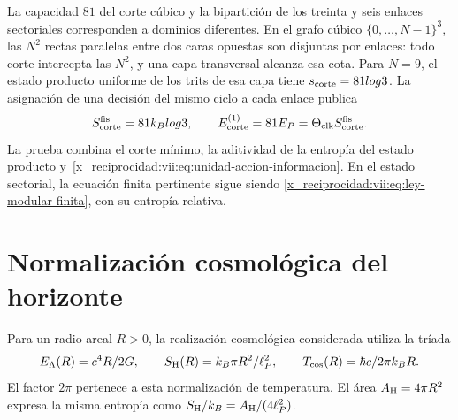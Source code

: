 La capacidad \(81\) del corte cúbico y la bipartición de los treinta y
seis enlaces sectoriales corresponden a dominios diferentes. En el
grafo cúbico \(\{0,\ldots,N-1\}^3\), las \(N^2\) rectas
paralelas entre dos caras opuestas son disjuntas por enlaces: todo corte
intercepta las \(N^2\), y una capa transversal alcanza esa cota.
Para \(N=9\), el estado producto uniforme de los trits de esa capa
tiene \(s_{\rm corte}=81\log3\). La asignación de una decisión del
mismo ciclo a cada enlace publica
\begin{equation}
 S_{\rm corte}^{\rm fis}=81k_B\log3,\qquad
 E_{\rm corte}^{(1)}=81E_P
                  =\Theta_{\rm clk}S_{\rm corte}^{\rm fis}.
 \label{x_reciprocidad:vii:eq:corte-energia-informacion}
\end{equation}
La prueba combina el corte mínimo, la aditividad de la entropía del
estado producto y~\eqref{x_reciprocidad:vii:eq:unidad-accion-informacion}. En el estado
sectorial, la ecuación finita pertinente sigue siendo
\eqref{x_reciprocidad:vii:eq:ley-modular-finita}, con su entropía relativa.

\section{Normalización cosmológica del horizonte}
\label{x_reciprocidad:vii:subsec:balance-horizonte}

Para un radio areal \(R>0\), la realización cosmológica considerada
utiliza la tríada
\begin{equation}
 E_\Lambda(R)=\frac{c^4R}{2G},\qquad
 S_{\rm H}(R)=\frac{k_B\pi R^2}{\ell_P^2},\qquad
 T_{\rm cos}(R)=\frac{\hbar c}{2\pi k_BR}.
 \label{x_reciprocidad:vii:eq:horizonte-cosmologico}
\end{equation}
El factor \(2\pi\) pertenece a esta normalización de temperatura.
El área \(\mathcal A_{\rm H}=4\pi R^2\) expresa la misma entropía
como \(S_{\rm H}/k_B=\mathcal A_{\rm H}/(4\ell_P^2)\).

